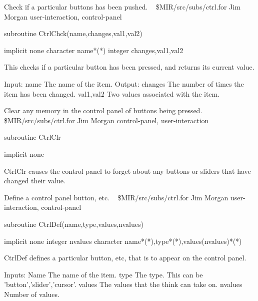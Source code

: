 %
\noindent Check if a particular buttons has been pushed.
\newline \ 
\newline {} \$MIR/src/subs/ctrl.for
\newline {} Jim Morgan
\newline {} user-interaction, control-panel
\par{\tenpoint
{\eightpoint\begintt
        subroutine CtrlChck(name,changes,val1,val2)

        implicit none
        character name*(*)
        integer changes,val1,val2

  This checks if a particular button has been pressed, and returns
  its current value.

  Input:
    name       The name of the item.
  Output:
    changes    The number of times the item has been changed.
    val1,val2  Two values associated with the item.
\endtt}
\par}
%
\noindent Clear any memory in the control panel of buttons being pressed.
\newline \ 
\newline \abox{File:} \$MIR/src/subs/ctrl.for
\newline {} Jim Morgan
\newline \abox{Keywords:} control-panel, user-interaction
\par{\tenpoint
{\eightpoint\begintt
        subroutine CtrlClr

        implicit none

  CtrlClr causes the control panel to forget about any buttons or sliders
  that have changed their value.
\endtt}
\par}
%
\noindent Define a control panel button, etc.
\newline \ 
\newline {} \$MIR/src/subs/ctrl.for
\newline \abox{Responsible:} Jim Morgan
\newline {} user-interaction, control-panel
\par{\tenpoint
{\eightpoint\begintt
        subroutine CtrlDef(name,type,values,nvalues)

        implicit none
        integer nvalues
        character name*(*),type*(*),values(nvalues)*(*)

  CtrlDef defines a particular button, etc, that is to appear on the
  control panel.

  Inputs:
    Name       The name of the item.
    type       The type. This can be 'button','slider','cursor'.
    values     The values that the think can take on.
    nvalues    Number of values.
\endtt}
\par}
